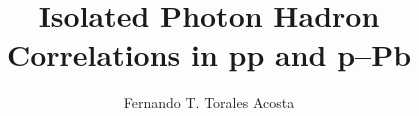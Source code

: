 \documentclass{ucbthesis}
\begin{document}

\title{Isolated Photon Hadron Correlations in pp and p--Pb}
\author{Fernando T. Torales Acosta}


\maketitle
\approvalpage
\copyrightpage


\end{document}
